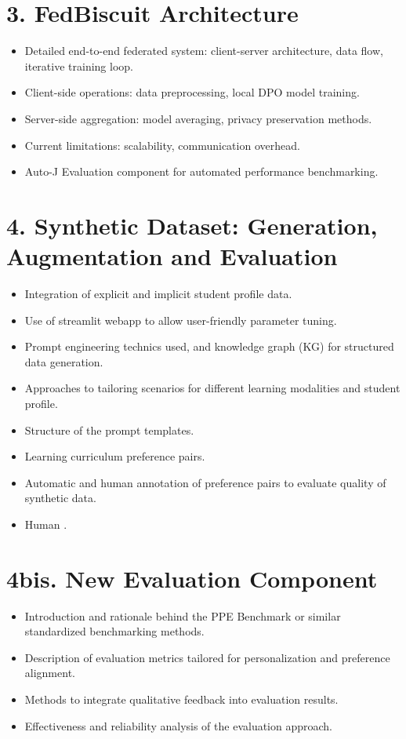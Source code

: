 \documentclass[headsepline,footsepline,footinclude=false,oneside,fontsize=10pt,paper=a4]{scrbook}
\begin{document}
\section*{3. FedBiscuit Architecture}
\begin{itemize}[leftmargin=1.5em]
    \item Detailed end-to-end federated system: client-server architecture, data flow, iterative training loop.
    \item Client-side operations: data preprocessing, local DPO model training.
    \item Server-side aggregation: model averaging, privacy preservation methods.
    \item Current limitations: scalability, communication overhead.
    \item Auto-J Evaluation component for automated performance benchmarking.
    \end{itemize}

\section*{4. Synthetic Dataset: Generation, Augmentation and Evaluation}
\begin{itemize}[leftmargin=1.5em]
    \item Integration of explicit and implicit student profile data.
    \item Use of streamlit webapp to allow user-friendly parameter tuning.
    \item Prompt engineering technics used, and knowledge graph (KG) for structured data generation.
    \item Approaches to tailoring scenarios for different learning modalities and student profile.
    \item Structure of the prompt templates.
    \item Learning curriculum preference pairs.
    \item Automatic and human annotation of preference pairs to evaluate quality of synthetic data.
    \item Human .
\end{itemize}

\section*{4bis. New Evaluation Component}
\begin{itemize}[leftmargin=1.5em]
    \item Introduction and rationale behind the PPE Benchmark or similar standardized benchmarking methods.
    \item Description of evaluation metrics tailored for personalization and preference alignment.
    \item Methods to integrate qualitative feedback into evaluation results.
    \item Effectiveness and reliability analysis of the evaluation approach.
\end{itemize}
\end{document}
